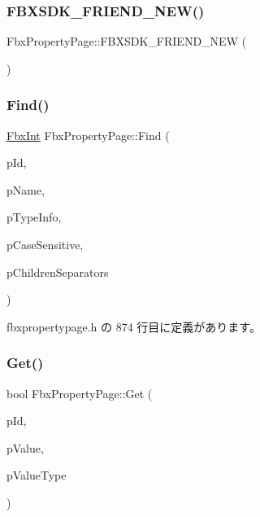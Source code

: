 \subsubsection{\texorpdfstring{F\+B\+X\+S\+D\+K\+\_\+\+F\+R\+I\+E\+N\+D\+\_\+\+N\+E\+W()}{FBXSDK\_FRIEND\_NEW()}}
{\footnotesize\ttfamily Fbx\+Property\+Page\+::\+F\+B\+X\+S\+D\+K\+\_\+\+F\+R\+I\+E\+N\+D\+\_\+\+N\+EW (\begin{DoxyParamCaption}{ }\end{DoxyParamCaption})}

\mbox{\label{class_fbx_property_page_acd7b8b3c47224b6426e6d732ea5a8607}} 
\subsubsection{\texorpdfstring{Find()}{Find()}}
{\footnotesize\ttfamily \hyperlink{fbxtypes_8h_a088fa96de3b0b3ea69f0f6afef525dfb}{Fbx\+Int} Fbx\+Property\+Page\+::\+Find (\begin{DoxyParamCaption}\item[{\hyperlink{fbxtypes_8h_a088fa96de3b0b3ea69f0f6afef525dfb}{Fbx\+Int}}]{p\+Id,  }\item[{const char $\ast$}]{p\+Name,  }\item[{\hyperlink{class_fbx_property_page}{Fbx\+Property\+Page} $\ast$}]{p\+Type\+Info,  }\item[{bool}]{p\+Case\+Sensitive,  }\item[{const char $\ast$}]{p\+Children\+Separators }\end{DoxyParamCaption})\hspace{0.3cm}{\ttfamily [inline]}}



 fbxpropertypage.\+h の 874 行目に定義があります。

\mbox{\label{class_fbx_property_page_acd65ab77363ace7bb4cd6fee60644721}} 
\subsubsection{\texorpdfstring{Get()}{Get()}\hspace{0.1cm}{\footnotesize\ttfamily [1/2]}}
{\footnotesize\ttfamily bool Fbx\+Property\+Page\+::\+Get (\begin{DoxyParamCaption}\item[{\hyperlink{fbxtypes_8h_a088fa96de3b0b3ea69f0f6afef525dfb}{Fbx\+Int}}]{p\+Id,  }\item[{void $\ast$}]{p\+Value,  }\item[{\hyperlink{fbxpropertytypes_8h_a73913a5ddfb20e57c6f25e9e6784bd92}{E\+Fbx\+Type}}]{p\+Value\+Type }\end{DoxyParamCaption})\hspace{0.3cm}{\ttfamily [inline]}}



